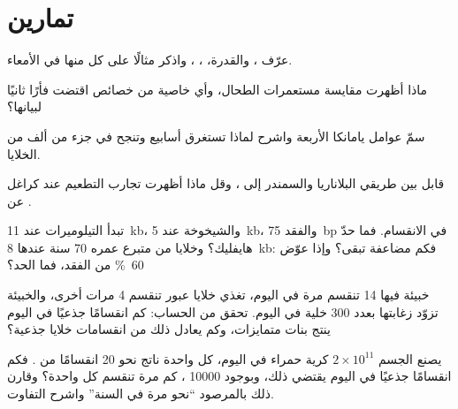 \section{تمارين}

\begin{exercise}[$\star$]\label{exo:b3:stem-cells:1}
عرّف ، والقدرة، ، ، واذكر مثالًا على كل منها في الأمعاء.
\end{exercise}

\begin{exercise}[$\star$]\label{exo:b3:stem-cells:2}
ماذا أظهرت مقايسة مستعمرات الطحال، وأي خاصية من خصائص  اقتضت فأرًا ثانيًا لبيانها؟
\end{exercise}

\begin{exercise}[$\star$]\label{exo:b3:stem-cells:3}
سمّ عوامل يامانكا الأربعة واشرح لماذا تستغرق 
أسابيع وتنجح في جزء من ألف من الخلايا.
\end{exercise}

\begin{exercise}[$\star$]\label{exo:b3:stem-cells:4}
قابل بين طريقي البلاناريا والسمندر إلى ، وقل ماذا
أظهرت تجارب التطعيم عند كراغل عن .
\end{exercise}

\begin{exercise}[$\star\star$]\label{exo:b3:stem-cells:5}
تبدأ التيلوميرات عند \qty{11}{kb}، والشيخوخة عند \qty{5}{kb}،
والفقد \qty{75}{bp} في الانقسام. فما حدّ هايفليك؟ وخلايا من
متبرع عمره 70 سنة عندها \qty{8}{kb}: فكم مضاعفة تبقى؟ وإذا
عوّض  \qty{60}{\%} من الفقد، فما الحد؟
\end{exercise}

\begin{exercise}[$\star\star$]\label{exo:b3:stem-cells:6}
خبيئة فيها 14  تنقسم مرة في اليوم، تغذي خلايا عبور
تنقسم 4 مرات أخرى، والخبيئة تزوّد زغابتها بعدد \num{300} خلية في
اليوم. تحقق من الحساب: كم انقسامًا جذعيًا في اليوم ينتج بنات
متمايزات، وكم يعادل ذلك من انقسامات خلايا جذعية؟
\end{exercise}

\begin{exercise}[$\star\star$]\label{exo:b3:stem-cells:7}
يصنع الجسم $2\times 10^{11}$ كرية حمراء في اليوم، كل واحدة
ناتج نحو 20 انقسامًا من . فكم انقسامًا جذعيًا في
اليوم يقتضي ذلك، وبوجود \num{10000} ، كم مرة تنقسم
كل واحدة؟ وقارن ذلك بالمرصود ``نحو مرة في السنة'' واشرح
التفاوت.
\end{exercise}

